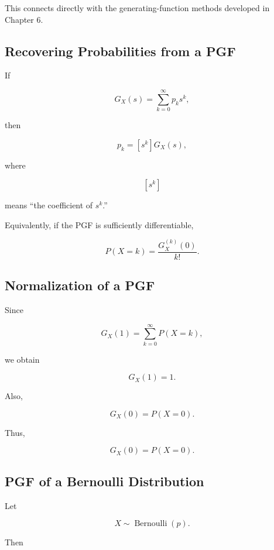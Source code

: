 This connects directly with the generating-function methods developed
in Chapter 6.

\subsection{Recovering Probabilities from a PGF}
\label{subsec:recover-probabilities-pgf}

If

\[
G_X(s)
=
\sum_{k=0}^{\infty}
p_ks^k,
\]

then

\[
\boxed{
p_k
=
[s^k]G_X(s),
}
\]

where

\[
[s^k]
\]

means ``the coefficient of \(s^k\).''

Equivalently, if the PGF is sufficiently differentiable,

\[
\boxed{
P(X=k)
=
\frac{
G_X^{(k)}(0)
}{
k!
}.
}
\]

\subsection{Normalization of a PGF}
\label{subsec:pgf-normalization}

Since

\[
G_X(1)
=
\sum_{k=0}^{\infty}
P(X=k),
\]

we obtain

\[
\boxed{
G_X(1)=1.
}
\]

Also,

\[
G_X(0)
=
P(X=0).
\]

Thus,

\[
\boxed{
G_X(0)=P(X=0).
}
\]

\subsection{PGF of a Bernoulli Distribution}
\label{subsec:pgf-bernoulli}

Let

\[
X\sim\operatorname{Bernoulli}(p).
\]

Then

